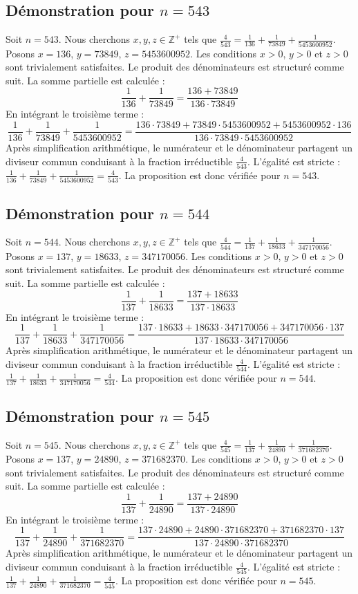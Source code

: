 \documentclass[11pt,a4paper]{article}
\begin{document}
\subsection{Démonstration pour $n = 543$}
Soit $n = 543$. Nous cherchons $x, y, z \in \mathbb{Z}^{+}$ tels que $\frac{4}{543} = \frac{1}{136} + \frac{1}{73849} + \frac{1}{5453600952}$.
Posons $x = 136$, $y = 73849$, $z = 5453600952$.
Les conditions $x > 0$, $y > 0$ et $z > 0$ sont trivialement satisfaites.
Le produit des dénominateurs est structuré comme suit. La somme partielle est calculée :
$$ \frac{1}{136} + \frac{1}{73849} = \frac{136+73849}{136 \cdot 73849} $$
En intégrant le troisième terme :
$$ \frac{1}{136} + \frac{1}{73849} + \frac{1}{5453600952} = \frac{136 \cdot 73849 + 73849 \cdot 5453600952 + 5453600952 \cdot 136}{136 \cdot 73849 \cdot 5453600952} $$
Après simplification arithmétique, le numérateur et le dénominateur partagent un diviseur commun conduisant à la fraction irréductible $\frac{4}{543}$.
L'égalité est stricte : $\frac{1}{136} + \frac{1}{73849} + \frac{1}{5453600952} = \frac{4}{543}$.
La proposition est donc vérifiée pour $n = 543$.
\subsection{Démonstration pour $n = 544$}
Soit $n = 544$. Nous cherchons $x, y, z \in \mathbb{Z}^{+}$ tels que $\frac{4}{544} = \frac{1}{137} + \frac{1}{18633} + \frac{1}{347170056}$.
Posons $x = 137$, $y = 18633$, $z = 347170056$.
Les conditions $x > 0$, $y > 0$ et $z > 0$ sont trivialement satisfaites.
Le produit des dénominateurs est structuré comme suit. La somme partielle est calculée :
$$ \frac{1}{137} + \frac{1}{18633} = \frac{137+18633}{137 \cdot 18633} $$
En intégrant le troisième terme :
$$ \frac{1}{137} + \frac{1}{18633} + \frac{1}{347170056} = \frac{137 \cdot 18633 + 18633 \cdot 347170056 + 347170056 \cdot 137}{137 \cdot 18633 \cdot 347170056} $$
Après simplification arithmétique, le numérateur et le dénominateur partagent un diviseur commun conduisant à la fraction irréductible $\frac{4}{544}$.
L'égalité est stricte : $\frac{1}{137} + \frac{1}{18633} + \frac{1}{347170056} = \frac{4}{544}$.
La proposition est donc vérifiée pour $n = 544$.
\subsection{Démonstration pour $n = 545$}
Soit $n = 545$. Nous cherchons $x, y, z \in \mathbb{Z}^{+}$ tels que $\frac{4}{545} = \frac{1}{137} + \frac{1}{24890} + \frac{1}{371682370}$.
Posons $x = 137$, $y = 24890$, $z = 371682370$.
Les conditions $x > 0$, $y > 0$ et $z > 0$ sont trivialement satisfaites.
Le produit des dénominateurs est structuré comme suit. La somme partielle est calculée :
$$ \frac{1}{137} + \frac{1}{24890} = \frac{137+24890}{137 \cdot 24890} $$
En intégrant le troisième terme :
$$ \frac{1}{137} + \frac{1}{24890} + \frac{1}{371682370} = \frac{137 \cdot 24890 + 24890 \cdot 371682370 + 371682370 \cdot 137}{137 \cdot 24890 \cdot 371682370} $$
Après simplification arithmétique, le numérateur et le dénominateur partagent un diviseur commun conduisant à la fraction irréductible $\frac{4}{545}$.
L'égalité est stricte : $\frac{1}{137} + \frac{1}{24890} + \frac{1}{371682370} = \frac{4}{545}$.
La proposition est donc vérifiée pour $n = 545$.
\end{document}

